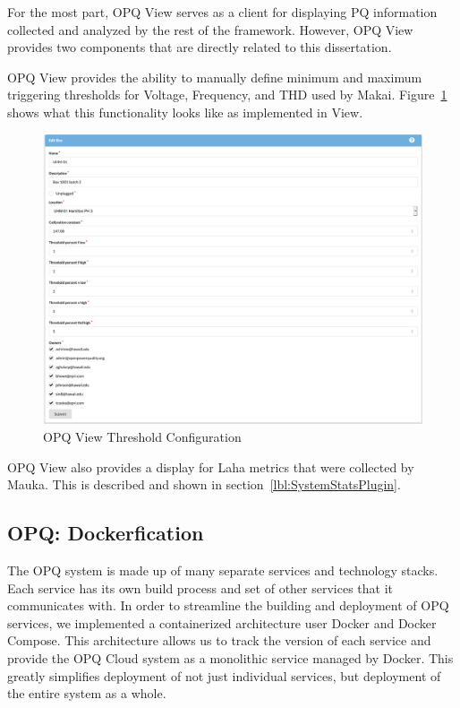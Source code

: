 For the most part, OPQ View serves as a client for displaying PQ information collected and analyzed by the rest of the framework. However, OPQ View provides two components that are directly related to this dissertation.

OPQ View provides the ability to manually define minimum and maximum triggering thresholds for Voltage, Frequency, and THD used by Makai. Figure~\ref{fig:view_thresholds} shows what this functionality looks like as implemented in View.

\begin{figure}
	\centering
	\includegraphics[width=1\linewidth]{figures/view_thresholds.png}
	\caption{OPQ View Threshold Configuration}\label{fig:view_thresholds}
\end{figure}

OPQ View also provides a display for Laha metrics that were collected by Mauka. This is described and shown in section~\ref{lbl:SystemStatsPlugin}.

\subsection{OPQ: Dockerfication}\label{subsec:opq:-dockerfication}
The OPQ system is made up of many separate services and technology stacks. Each service has its own build process and set of other services that it communicates with. In order to streamline the building and deployment of OPQ services, we implemented a containerized architecture user Docker and Docker Compose. This architecture allows us to track the version of each service and provide the OPQ Cloud system as a monolithic service managed by Docker. This greatly simplifies deployment of not just individual services, but deployment of the entire system as a whole.


